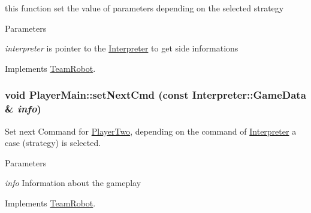 this function set the value of parameters depending on the selected strategy 


\begin{DoxyParams}{Parameters}
\item[{\em interpreter}]is pointer to the \hyperlink{classInterpreter}{Interpreter} to get side informations \end{DoxyParams}


Implements \hyperlink{classTeamRobot_a34c0fd6986c510d4025e5752b3c0e49a}{TeamRobot}.

\hypertarget{classPlayerMain_a8f0320189df15529662c7f16d2f74084}{
\subsubsection[{setNextCmd}]{\setlength{\rightskip}{0pt plus 5cm}void PlayerMain::setNextCmd (const {\bf Interpreter::GameData} \& {\em info})}}
\label{classPlayerMain_a8f0320189df15529662c7f16d2f74084}


Set next Command for \hyperlink{classPlayerTwo}{PlayerTwo}, depending on the command of \hyperlink{classInterpreter}{Interpreter} a case (strategy) is selected. 


\begin{DoxyParams}{Parameters}
\item[{\em info}]Information about the gameplay \end{DoxyParams}


Implements \hyperlink{classTeamRobot_a65f9a2b7464dfac3f4a0336810cf574f}{TeamRobot}.



